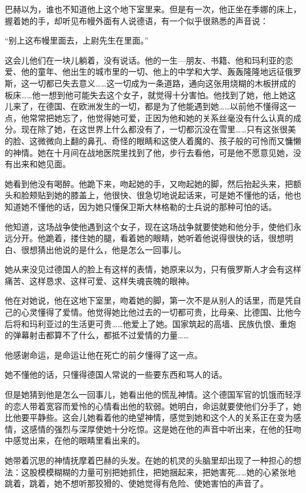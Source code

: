 巴赫以为，谁也不知道他上这个地下室里来。但是有一次，他正坐在季娜的床上，握着她的手，却听见布幔外面有人说德语，有一个似乎很熟悉的声音说：

“别上这布幔里面去，上尉先生在里面。”

这会儿他们在一块儿躺着，没有说话。他的一生—朋友、书籍、他和玛利亚的恋爱、他的童年、他出生的城市里的一切、他上的中学和大学、轰轰隆隆地远征俄罗斯，这一切都已失去意义……这一切成为一条道路，通向这张用烧糊的木板拼成的板床……他一想到他可能失去这个女子，就觉得十分害怕。他找到了她，他上她这儿来了，在德国、在欧洲发生的一切，都是为了他能遇到她……以前他不懂得这一点，他常常把她忘了，他觉得她可爱，正因为他和她的关系丝毫没有什么认真的成分。现在除了她，在这世界上什么都没有了，一切都沉没在雪里……只有这张很美的脸、这微微向上翻的鼻孔、奇怪的眼睛和这使人着魔的、孩子般的可怜而又慵懒的神情。她在十月间在战地医院里找到了他，步行去看他，可是他不愿意见她，没有出来和她见面。

她看到他没有喝醉。他跪下来，吻起她的手，又吻起她的脚，然后抬起头来，把额头和脸颊贴到她的膝盖上，他很快、很急切地说起话来，可是她不懂他的话，他也知道她不懂他的话，因为她只懂保卫斯大林格勒的士兵说的那种可怕的话。

他知道，这场战争使他遇到这个女子，现在这场战争就要使她和他分手，使他们永远分开。他跪着，搂住她的腿，看着她的眼睛，她听着他说得很快的话，很想明白、很想猜出他说的是什么，他是怎么一回事儿。

她从来没见过德国人的脸上有这样的表情，她原来以为，只有俄罗斯人才会有这样痛苦、这样恳求、这样可爱、这样失魂丧魄的眼神。

他在对她说，他在这地下室里，吻着她的脚，第一次不是从别人的话里，而是凭自己的心灵懂得了爱情。他觉得她比他过去的一切都可贵，比母亲、比德国、比他今后将和玛利亚过的生活更可贵……他爱上了她。国家筑起的高墙、民族仇恨、重炮的弹幕射击都算不了什么，都抵不过爱情的力量……

他感谢命运，是命运让他在死亡的前夕懂得了这一点。

她不懂他的话，只懂得德国人常说的一些要东西和骂人的话。

但是她猜到他是怎么一回事儿，她看出他的慌乱神情。这个德国军官的饥饿而轻浮的恋人带着宽容而爱怜的心情看出他的软弱。她明白，命运就要使他们分手了，她比他要平静些。这会儿她看着他的绝望神情，感觉到她和这个人的关系正在变为感情，这感情的强烈与深厚使她十分吃惊。这是她在他的声音中听出来，在他的狂吻中感觉出来，在他的眼睛里看出来的。

她带着沉思的神情抚摩着巴赫的头发。在她的机灵的头脑里却出现了一种担心的想法：这股模模糊糊的力量可别把她抓住，把她捆起来，把她害死……她的心紧张地跳着，跳着，她不想听那狡猾的、使她觉得有危险、使她害怕的声音了。

